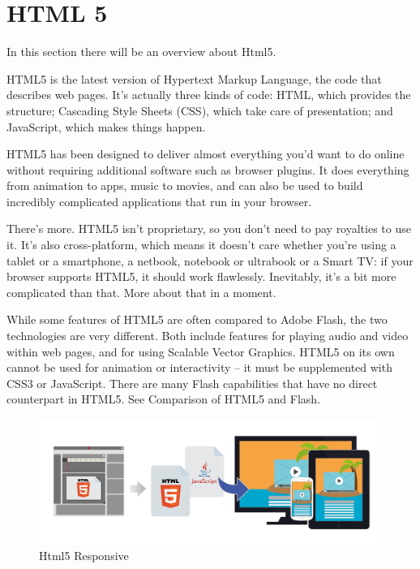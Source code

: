 \section{HTML 5}
\label{sec:TCH_html5}

In this section there will be an overview about Html5.

HTML5 is the latest version of Hypertext Markup Language, the code that describes web pages. It's actually three kinds of code: HTML, which provides the structure; Cascading Style Sheets (CSS), which take care of presentation; and JavaScript, which makes things happen.

HTML5 has been designed to deliver almost everything you'd want to do online without requiring additional software such as browser plugins. It does everything from animation to apps, music to movies, and can also be used to build incredibly complicated applications that run in your browser.

There's more. HTML5 isn't proprietary, so you don't need to pay royalties to use it. It's also cross-platform, which means it doesn't care whether you're using a tablet or a smartphone, a netbook, notebook or ultrabook or a Smart TV: if your browser supports HTML5, it should work flawlessly. Inevitably, it's a bit more complicated than that. More about that in a moment.

While some features of HTML5 are often compared to Adobe Flash, the two technologies are very different. Both include features for playing audio and video within web pages, and for using Scalable Vector Graphics. HTML5 on its own cannot be used for animation or interactivity – it must be supplemented with CSS3 or JavaScript. There are many Flash capabilities that have no direct counterpart in HTML5. See Comparison of HTML5 and Flash.

\begin {figure}[h]
\graphicspath{{images/chapter_TCH/}}
\includegraphics[width=\textwidth]{html5_1}
\caption{Html5 Responsive}
\end {figure}

